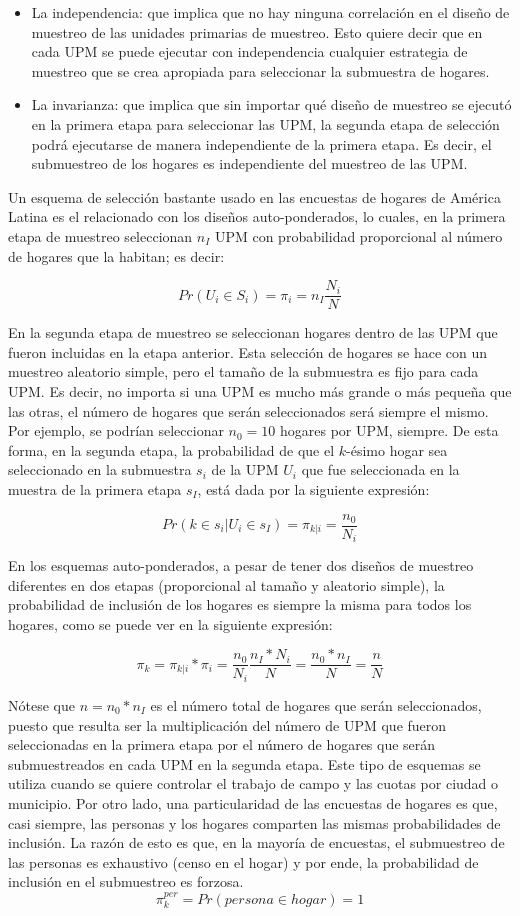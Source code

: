 \documentclass[12pt,spanish,]{book}
\providecommand{\tightlist}{%
  \setlength{\itemsep}{0pt}\setlength{\parskip}{0pt}}
\begin{document}
\begin{itemize}
\tightlist
\item
  La independencia: que implica que no hay ninguna correlación en el diseño de muestreo de las unidades primarias de muestreo. Esto quiere decir que en cada UPM se puede ejecutar con independencia cualquier estrategia de muestreo que se crea apropiada para seleccionar la submuestra de hogares.
\item
  La invarianza: que implica que sin importar qué diseño de muestreo se ejecutó en la primera etapa para seleccionar las UPM, la segunda etapa de selección podrá ejecutarse de manera independiente de la primera etapa. Es decir, el submuestreo de los hogares es independiente del muestreo de las UPM.
\end{itemize}

Un esquema de selección bastante usado en las encuestas de hogares de América Latina es el relacionado con los diseños auto-ponderados, lo cuales, en la primera etapa de muestreo seleccionan \(n_I\) UPM con probabilidad proporcional al número de hogares que la habitan; es decir:

\[Pr(U_i \in S_i) = \pi_i = n_I \frac{N_i}{N}\]

En la segunda etapa de muestreo se seleccionan hogares dentro de las UPM que fueron incluidas en la etapa anterior. Esta selección de hogares se hace con un muestreo aleatorio simple, pero el tamaño de la submuestra es fijo para cada UPM. Es decir, no importa si una UPM es mucho más grande o más pequeña que las otras, el número de hogares que serán seleccionados será siempre el mismo. Por ejemplo, se podrían seleccionar \(n_0 = 10\) hogares por UPM, siempre. De esta forma, en la segunda etapa, la probabilidad de que el \(k\)-ésimo hogar sea seleccionado en la submuestra \(s_i\) de la UPM \(U_i\) que fue seleccionada en la muestra de la primera etapa \(s_I\), está dada por la siguiente expresión:

\[Pr(k \in s_i | U_i \in s_I ) = \pi_{k|i} = \frac{n_0}{N_i}\]

En los esquemas auto-ponderados, a pesar de tener dos diseños de muestreo diferentes en dos etapas (proporcional al tamaño y aleatorio simple), la probabilidad de inclusión de los hogares es siempre la misma para todos los hogares, como se puede ver en la siguiente expresión:

\[\pi_k = \pi_{k|i} * \pi_i = \frac{n_0}{N_i} \frac{n_I* N_i}{N} = \frac{n_0*n_I}{N} = \frac{n}{N}\]

Nótese que \(n = n_0 * n_I\) es el número total de hogares que serán seleccionados, puesto que resulta ser la multiplicación del número de UPM que fueron seleccionadas en la primera etapa por el número de hogares que serán submuestreados en cada UPM en la segunda etapa. Este tipo de esquemas se utiliza cuando se quiere controlar el trabajo de campo y las cuotas por ciudad o municipio. Por otro lado, una particularidad de las encuestas de hogares es que, casi siempre, las personas y los hogares comparten las mismas probabilidades de inclusión. La razón de esto es que, en la mayoría de encuestas, el submuestreo de las personas es exhaustivo (censo en el hogar) y por ende, la probabilidad de inclusión en el submuestreo es forzosa.
\[\pi_k^{per} = Pr(persona \in hogar) =  1\]
\end{document}
